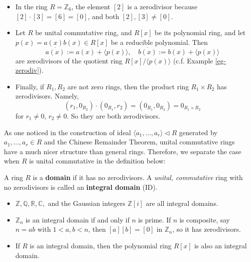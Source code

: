 \begin{example}
\begin{itemize}
\item In the ring $R = \mathbb{Z}_6$, the element $[2]$ is a zerodivisor because $[2] \cdot [3] = [6] = [0]$, and both $[2], [3] \neq [0]$. 

\item Let $R$ be unital commutative ring, and $R[x]$ be its polynomial ring, and let $p(x) = a(x)b(x) \in R[x]$ be a reducible polynomial. Then
$$\overline{a(x)} := a(x) + \langle p(x) \rangle, \quad \overline{b(x)} := b(x) + \langle p(x) \rangle$$
are zerodivisors of the quotient ring $R[x]/\langle p(x) \rangle$ (c.f. Example \ref{eg-zerodiv}).

\item Finally, if $R_1, R_2$ are not zero rings, then the product ring $R_1 \times R_2$ has zerodivisors. Namely, $$(r_1,0_{R_2}) \cdot (0_{R_1},r_2) = (0_{R_1},0_{R_2}) = 0_{R_1 \times R_2}$$
for $r_1 \neq 0$, $r_2 \neq 0$. So they are both zerodivisors.
\end{itemize}
\end{example}


As one noticed in the construction of ideal $\langle a_1, \dots, a_r \rangle \lhd R$ generated by $a_1, \dots, a_r \in R$ and the Chinese Remainder Theorem, unital commutative rings have a much nicer structure than general rings. 
Therefore, we separate the case when $R$ is unital commutative in the definition below:
\begin{definition}
A ring $R$ is a \textbf{domain} if it has no zerodivisors. A {\it unital, commutative} ring with no zerodivisors is called an \textbf{integral domain} (ID).
\end{definition}


\begin{example}
\begin{itemize}
    \item $\mathbb{Z}, \mathbb{Q}, \mathbb{R}, \mathbb{C},$ and the Gaussian integers $\mathbb{Z}[i]$ are all integral domains.
    \item $\mathbb{Z}_n$ is an integral domain if and only if $n$ is prime. If $n$ is composite, say $n = ab$ with $1 < a, b < n$, then $[a][b] = [0]$ in $\mathbb{Z}_n$, so it has zerodivisors.
    \item If $R$ is an integral domain, then the polynomial ring $R[x]$ is also an integral domain.
\end{itemize}
\end{example}

